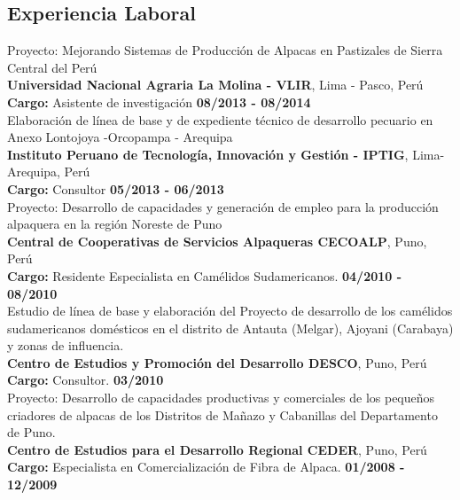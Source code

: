\documentclass[margin,line,10pt]{res}
\begin{document}
\begin{resume}
\section{\sc Experiencia \phantom{1cm} Laboral}

Proyecto: Mejorando Sistemas de Producción de Alpacas en Pastizales de Sierra Central del Perú\\
{\bf Universidad Nacional Agraria La Molina - VLIR}, Lima - Pasco, Perú\\
\vspace{-.3cm}
\textbf{Cargo:} Asistente de investigación \hfill {\bf 08/2013 - 08/2014}\\
 
Elaboración de línea de base y de expediente técnico de desarrollo pecuario en Anexo Lontojoya -Orcopampa - Arequipa\\
{\bf Instituto Peruano de Tecnología, Innovación y Gestión - IPTIG}, Lima-Arequipa, Perú\\
\vspace{-.3cm}
\textbf{Cargo:} Consultor  \hfill {\bf 05/2013 - 06/2013}\\

Proyecto: Desarrollo de capacidades y generación de empleo para la producción alpaquera en la región Noreste de Puno\\
{\bf Central de Cooperativas de Servicios Alpaqueras CECOALP}, Puno, Perú\\
\vspace{-.3cm}
\textbf{Cargo:} Residente Especialista en Camélidos Sudamericanos.  \hfill {\bf 04/2010 - 08/2010}\\

Estudio de línea de base y elaboración del Proyecto de desarrollo de los camélidos sudamericanos domésticos en el distrito de Antauta (Melgar), Ajoyani (Carabaya) y zonas de influencia.\\
{\bf Centro de Estudios y Promoción del Desarrollo DESCO}, Puno, Perú\\
\vspace{-.3cm}
\textbf{Cargo:} Consultor.  \hfill {\bf 03/2010}\\

Proyecto: Desarrollo de capacidades productivas y comerciales de los pequeños criadores de alpacas de los Distritos de Mañazo y Cabanillas del Departamento de Puno.\\
{\bf Centro de Estudios para el Desarrollo Regional CEDER}, Puno, Perú\\
\vspace{-.3cm}
\textbf{Cargo:} Especialista en Comercialización de Fibra de Alpaca.  \hfill {\bf 01/2008 - 12/2009}\\


\end{resume}
\end{document}
